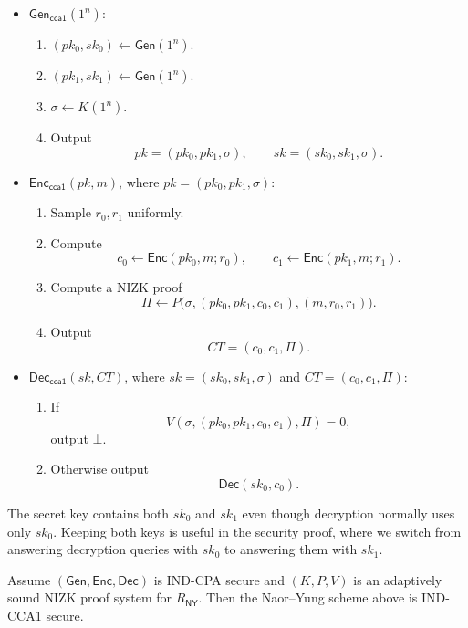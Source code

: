 \begin{itemize}
    \item $\mathsf{Gen}_{\mathsf{cca1}}(1^n)$:
    \begin{enumerate}
        \item $(pk_0,sk_0)\gets \mathsf{Gen}(1^n)$.
        \item $(pk_1,sk_1)\gets \mathsf{Gen}(1^n)$.
        \item $\sigma\gets K(1^n)$.
        \item Output
        \[
        pk=(pk_0,pk_1,\sigma),
        \qquad
        sk=(sk_0,sk_1,\sigma).
        \]
    \end{enumerate}

    \item $\mathsf{Enc}_{\mathsf{cca1}}(pk,m)$, where $pk=(pk_0,pk_1,\sigma)$:
    \begin{enumerate}
        \item Sample $r_0,r_1$ uniformly.
        \item Compute
        \[
        c_0\gets \mathsf{Enc}(pk_0,m;r_0),
        \qquad
        c_1\gets \mathsf{Enc}(pk_1,m;r_1).
        \]
        \item Compute a NIZK proof
        \[
        \Pi\gets P\bigl(\sigma,
        (pk_0,pk_1,c_0,c_1),
        (m,r_0,r_1)
        \bigr).
        \]
        \item Output
        \[
        CT=(c_0,c_1,\Pi).
        \]
    \end{enumerate}

    \item $\mathsf{Dec}_{\mathsf{cca1}}(sk,CT)$, where
    $sk=(sk_0,sk_1,\sigma)$ and $CT=(c_0,c_1,\Pi)$:
    \begin{enumerate}
        \item If
        \[
        V(\sigma,(pk_0,pk_1,c_0,c_1),\Pi)=0,
        \]
        output $\bot$.
        \item Otherwise output
        \[
        \mathsf{Dec}(sk_0,c_0).
        \]
    \end{enumerate}
\end{itemize}

The secret key contains both $sk_0$ and $sk_1$ even though decryption normally
uses only $sk_0$. Keeping both keys is useful in the security proof, where we
switch from answering decryption queries with $sk_0$ to answering them with
$sk_1$.

\begin{theorem}\label{thm:naor-yung-cca1}
Assume $(\mathsf{Gen},\mathsf{Enc},\mathsf{Dec})$ is IND-CPA secure and
$(K,P,V)$ is an adaptively sound NIZK proof system for $R_{\mathsf{NY}}$.
Then the Naor--Yung scheme above is IND-CCA1 secure.
\end{theorem}

